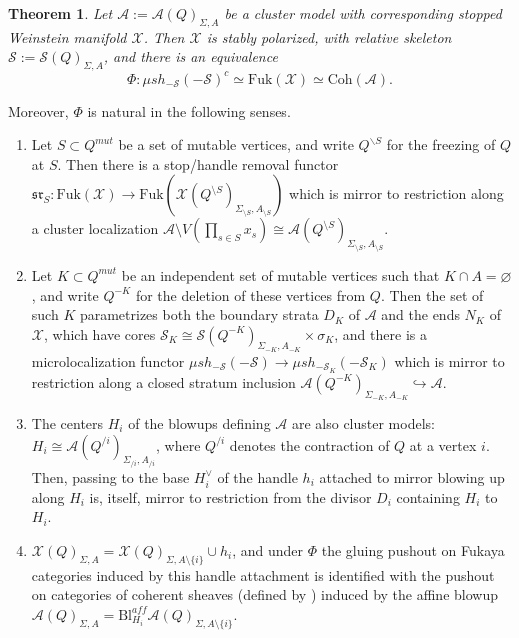 \documentclass[11pt]{amsart}
\newtheorem{thm}{Theorem}[section]
\theoremstyle{definition}
\theoremstyle{remark}
\newcommand{\A}{\mathcal{A}}
\newcommand{\X}{\mathcal{X}}
\newcommand{\Coh}{\mathrm{Coh}}
\newcommand{\Fuk}{\mathrm{Fuk}}
\renewcommand{\emptyset}{\varnothing}
\numberwithin{equation}{section}
\begin{document}
\begin{thm}\label{natural CM HMS}
    Let $\A := \mathcal{A}(Q)_{\Sigma,A}$ be a cluster model with corresponding stopped Weinstein manifold $\X$. Then $\X$ is stably polarized, with relative skeleton $\mathcal{S} := \mathcal{S}(Q)_{\Sigma,A}$, and there is an equivalence
$$\Phi: \mu sh_{-\mathcal{S}}(-\mathcal{S})^c \simeq \Fuk(\X) \simeq \Coh(\A).$$
\end{thm}

Moreover, $\Phi$ is natural in the following senses.

\begin{enumerate}
    \item Let $S \subset Q^{mut}$ be a set of mutable vertices, and write $Q^{\backslash S}$ for the freezing of $Q$ at $S$. Then there is a stop/handle removal functor $\mathfrak{sr}_S: \Fuk(\X) \to \Fuk(\mathcal{X}(Q^{\setminus S})_{\Sigma_{\setminus S},A_{\setminus S}})$ which is mirror to restriction along a cluster localization $\mathcal{A} \setminus V(\prod_{s\in S} x_s) \cong \mathcal{A}(Q^{\setminus S})_{\Sigma_{\setminus S},A_{\setminus S}}$.
    \item Let $K \subset Q^{mut}$ be an independent set of mutable vertices such that $K \cap A = \emptyset$, and write $Q^{-K}$ for the deletion of these vertices from $Q$. Then the set of such $K$ parametrizes both the boundary strata $D_K$ of $\mathcal A$ and the ends $N_K$ of $\mathcal X$, which have cores $\mathcal S_K\cong\mathcal S(Q^{-K})_{\Sigma_{-K},A_{-K}}\times\sigma_K$, and there is a microlocalization functor $\mu sh_{-\mathcal{S}}(-\mathcal{S}) \rightarrow \mu sh_{-\mathcal{S}_{K}}(-\mathcal{S}_{K})$ which is mirror to restriction along a closed stratum inclusion $\mathcal{A}(Q^{-K})_{\Sigma_{-K},A_{-K}} \hookrightarrow \A$.
    \item The centers $H_i$ of the blowups defining $\A$ are also cluster models: $H_i \cong \mathcal{A}(Q^{/i})_{\Sigma_{/i},A_{/i}}$, where $Q^{/i}$ denotes the contraction of $Q$ at a vertex $i$. Then, passing to the base $H_i^\vee$ of the handle $h_i$ attached to mirror blowing up along $H_i$ is, itself, mirror to restriction from the divisor $D_i$ containing $H_i$ to $H_i$.
    \item $\mathcal{X}(Q)_{\Sigma,A} = \mathcal{X}(Q)_{\Sigma,A\setminus\{i\}} \cup h_i$, and under $\Phi$ the gluing pushout on Fukaya categories induced by this handle attachment is identified with the pushout on categories of coherent sheaves (defined by \cite{GL}) induced by the affine blowup $\mathcal{A}(Q)_{\Sigma,A} = \mathrm{Bl}^{aff}_{H_i}\mathcal{A}(Q)_{\Sigma,A\setminus\{i\}}$.
\end{enumerate}
\end{document}
